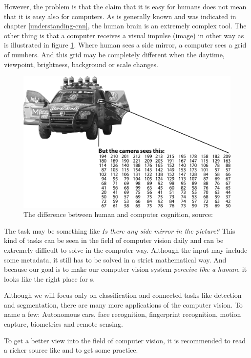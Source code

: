 However, the problem is that the claim that it is easy for humans does not mean 
that it is easy also for computers. As is generally known and was indicated in 
chapter \ref{understanding-cnn}, the human brain is an extremely complex tool. 
The other thing is that a computer receives a visual impulse (image) in other 
way as is illustrated in figure \ref{fig:mirror}. Where human sees a side 
mirror, a computer sees a grid of numbers. And this grid may be completely 
different when the daytime, viewpoint, brightness, background or scale changes.

\begin{figure}[H]
   \centering
	\includegraphics[width=.8\linewidth]{./pictures/comp-vision.png}
	\caption[Human and computer cognition]{The difference between human and 
computer cognition, source: \cite{opencv}}
      \label{fig:mirror}
\end{figure}

The task may be something like \textit{Is there any side mirror in the picture?} 
This kind of tasks can be seen in the field of computer vision daily and can be 
extremely difficult to solve in the computer way. Although the input may include 
some metadata, it still has to be solved in a strict mathematical way. And 
because our goal is to make our computer vision system \textit{perceive like a 
human}, it looks like the right place for s.

Although we will focus only on classification and connected tasks like detection 
and segmentation, there are many more applications of the computer vision. To 
name a few: Autonomous cars, face recognition, fingerprint recognition, motion 
capture, biometrics and remote sensing.

To get a better view into the field of computer vision, it is recommended to 
read a richer source like \cite{comp-vision} and \cite{opencv} to get some 
practice.

